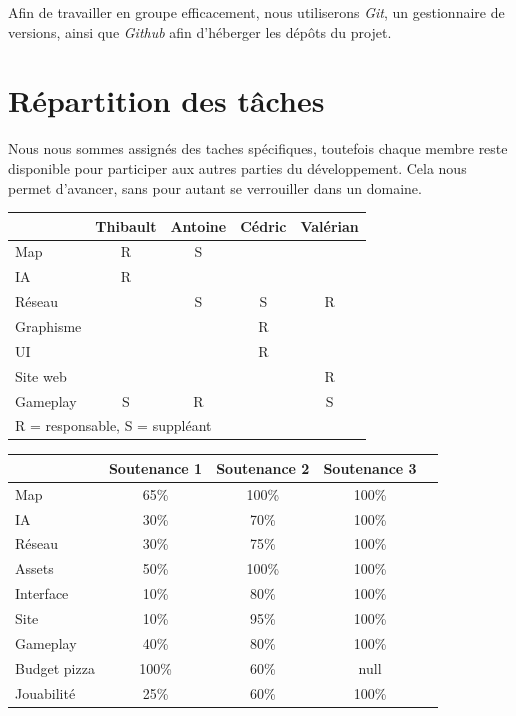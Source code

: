 \documentclass[12pt]{report}
\begin{document}
Afin de travailler en groupe efficacement, nous utiliserons \textit{Git}, un gestionnaire de versions, ainsi que \textit{Github} afin d’héberger les dépôts du projet.\\

\chapter{Répartition des tâches}

Nous nous sommes assignés des taches spécifiques, toutefois chaque membre reste disponible pour participer aux autres parties du développement. Cela nous permet d’avancer, sans pour autant se verrouiller dans un domaine.\\

\begin{center}
\begin{tabular}{@{} l *4c @{}}
\toprule
\multicolumn{1}{c}{}    & \textbf{Thibault}  & \textbf{Antoine}  & \textbf{Cédric} & \textbf{Valérian} \\ 
\midrule
Map & R & S & & \\
IA & R & & & \\
Réseau & & S & S & R \\
Graphisme & & & R & \\
UI & & & R & \\
Site web & & & & R \\
Gameplay & S & R & & S\\
\bottomrule
\multicolumn{4}{l}{\footnotesize R = responsable, S = suppléant}\\
\end{tabular}
\end{center}

\vspace{2em}

\begin{center}
\begin{tabular}{@{} l *4c @{}}
\toprule
\multicolumn{1}{c}{}    & \textbf{Soutenance 1}  & \textbf{Soutenance 2}  & \textbf{Soutenance 3} \\ 
\midrule
Map & 65\% & 100\% & 100\% \\
IA & 30\% & 70\% & 100\% \\
Réseau & 30\% & 75\% & 100\% \\
Assets & 50\% & 100\% & 100\% \\
Interface & 10\% & 80\% & 100\% \\
Site & 10\% & 95\% & 100\% \\
Gameplay & 40\% & 80\% & 100\% \\
Budget pizza & 100\% & 60\% & null\\
\midrule
Jouabilité & 25\% & 60\% & 100\% \\
\bottomrule
\end{tabular}
\end{center}
\end{document}

